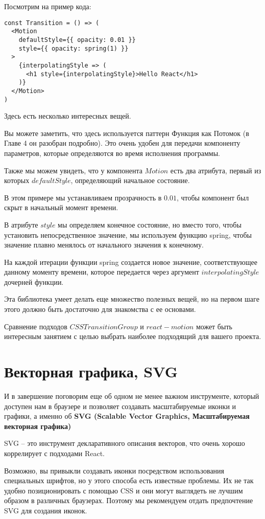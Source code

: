 Посмотрим на пример кода:

\begin{lstlisting}
const Transition = () => (
  <Motion
    defaultStyle={{ opacity: 0.01 }}
    style={{ opacity: spring(1) }}
  >
    {interpolatingStyle => (
      <h1 style={interpolatingStyle}>Hello React</h1>
    )} 
  </Motion>
)
\end{lstlisting}

Здесь есть несколько интересных вещей.

Вы можете заметить, что здесь используется паттерн Функция как Потомок (в Главе 4 он разобран подробно). Это очень удобен для передачи компоненту параметров, которые определяются во время исполнения программы.

Также мы можем увидеть, что у компонента $Motion$ есть два атрибута, первый из которых $defaultStyle$, определяющий начальное состояние.

В этом примере мы устанавливаем прозрачность в $0.01$, чтобы компонент был скрыт в начальный момент времени.

В атрибуте $style$ мы определяем конечное состояние, но вместо того, чтобы установить непосредственное значение, мы используем функцию spring, чтобы значение плавно менялось от начального значения к конечному.

На каждой итерации функции spring создается новое значение, соответствующее данному моменту времени, которое передается через аргумент $interpolatingStyle$ дочерней функции.

Эта библиотека умеет делать еще множество полезных вещей, но на первом шаге этого должно быть достаточно для знакомства с ее основами.

Сравнение подходов $CSSTransitionGroup$ и $react-motion$ может быть интересным занятием с целью выбрать наиболее подходящий для вашего проекта.

\section{Векторная графика, SVG}

И в завершение поговорим еще об одном не менее важном инструменте, который доступен нам в браузере и позволяет создавать масштабируемые иконки и графики, а именно об \textbf{SVG (Scalable Vector Graphics, Масштабируемая векторная графика)}

SVG -- это инструмент декларативного описания векторов, что очень хорошо коррелирует с подходами React.

Возможно, вы привыкли создавать иконки посредством использования специальных шрифтов, но у этого способа есть известные проблемы. Их не так удобно позиционировать с помощью CSS и они могут выглядеть не лучшим образом в различных браузерах. Поэтому мы рекомендуем отдать предпочтение SVG для создания иконок. 

